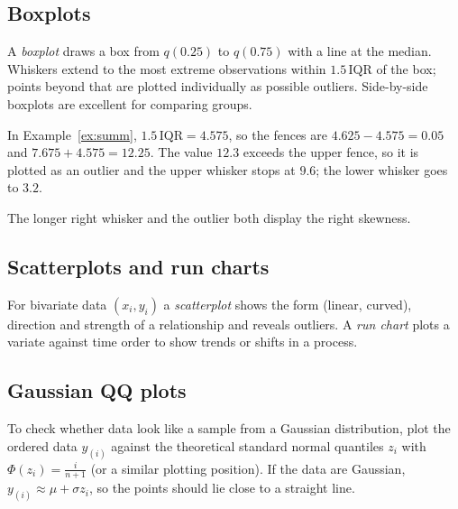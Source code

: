 \subsection{Boxplots}
A \emph{boxplot} draws a box from $q(0.25)$ to $q(0.75)$ with a line at the median.
Whiskers extend to the most extreme observations within $1.5\,\mathrm{IQR}$ of the box;
points beyond that are plotted individually as possible outliers. Side-by-side boxplots
are excellent for comparing groups.

\begin{example}
In Example~\ref{ex:summ}, $1.5\,\mathrm{IQR} = 4.575$, so the fences are
$4.625 - 4.575 = 0.05$ and $7.675 + 4.575 = 12.25$. The value $12.3$ exceeds the upper
fence, so it is plotted as an outlier and the upper whisker stops at $9.6$; the lower
whisker goes to $3.2$.
\begin{center}
\end{center}
The longer right whisker and the outlier both display the right skewness.
\end{example}

\subsection{Scatterplots and run charts}
For bivariate data $(x_i,y_i)$ a \emph{scatterplot} shows the form (linear, curved),
direction and strength of a relationship and reveals outliers. A \emph{run chart} plots a
variate against time order to show trends or shifts in a process.

\subsection{Gaussian QQ plots}

\begin{definition}[QQ plot]
To check whether data look like a sample from a Gaussian distribution, plot the ordered
data $y_{(i)}$ against the theoretical standard normal quantiles $z_i$ with
$\Phi(z_i) = \frac{i}{n+1}$ (or a similar plotting position). If the data are Gaussian,
$y_{(i)} \approx \mu + \sigma z_i$, so the points should lie close to a straight line.
\end{definition}

